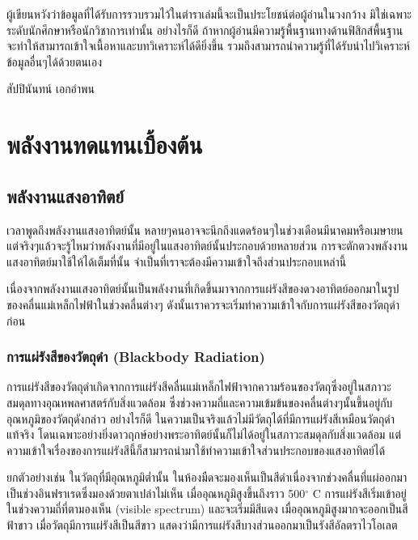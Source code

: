 \message{ !name(solar.tex)}\documentclass[
a4paper,
svgnames,
openany,
justified,
]{tufte-book}
\begin{document}
ผู้เขียนหวังว่าข้อมูลที่ได้รับการรวบรวมไว้ในตำราเล่มนี้จะเป็นประโยชน์ต่อผู้อ่านในวงกว้าง มิใช่เฉพาะระดับนักศึกษาหรือนักวิชาการเท่านั้น อย่างไรก็ดี ถ้าหากผู้อ่านมีความรู้พื้นฐานทางด้านฟิสิกส์พื้นฐาน จะทำให้สามารถเข้าใจเนื้อหาและบทวิเคราะห์ได้ดียิ่งขึ้น รวมถึงสามารถนำความรู้ที่ได้รับนำไปวิเคราะห์ข้อมูลอื่นๆได้ด้วยตนเอง

\vspace{2cm}\hspace{5cm}สัปปินันทน์ เอกอำพน

\clearpage
\tableofcontents

\clearpage
\listoffigures

\clearpage
\listoftables

\mainmatter

\part{พลังงานทดแทนเบื้องต้น}

\chapter{พลังงานแสงอาทิตย์}

เวลาพูดถึงพลังงานแสงอาทิตย์นั้น หลายๆคนอาจจะนึกถึงแดดร้อนๆในช่วงเดือนมีนาคมหรือเมษายน แต่จริงๆแล้วจะรู้ไหมว่าพลังงานที่มีอยู่ในแสงอาทิตย์นั้นประกอบด้วยหลายส่วน การจะตักตวงพลังงานแสงอาทิตย์มาใช้ให้ได้เต็มที่นั้น จำเป็นที่เราจะต้องมีความเข้าใจถึงส่วนประกอบเหล่านี้

เนื่องจากพลังงานแสงอาทิตย์นั้นเป็นพลังงานที่เกิดขึ้นมาจากการแผ่รังสีของดวงอาทิตย์ออกมาในรูปของคลื่นแม่เหล็กไฟฟ้าในช่วงคลื่นต่างๆ ดังนั้นเราควรจะเริ่มทำความเข้าใจกับการแผ่รังสีของวัตถุดำก่อน

\section{การแผ่รังสีของวัตถุดำ (Blackbody Radiation)}

การแผ่รังสีของวัตถุดำเกิดจากการแผ่รังสีคลื่นแม่เหล็กไฟฟ้าจากความร้อนของวัตถุซึ่งอยู่ในสภาวะสมดุลทางอุณหพลศาสตร์กับสิ่งแวดล้อม ซึ่งช่วงความถี่และความเข้มข้นของคลื่นต่างๆนั้นขึ้นอยู่กับอุณหภูมิของวัตถุดังกล่าว อย่างไรก็ดี ในความเป็นจริงแล้วไม่มีวัตถุได้ที่มีการแผ่รังสีเหมือนวัตถุดำแท้จริง โดนเฉพาะอย่างยิ่งดาวฤกษ์อย่างพระอาทิตย์นั้นก็ไม่ได้อยู่ในสภาวะสมดุลกับสิ่งแวดล้อม แต่ความเข้าใจเรื่องของการแผ่รังสีนี้ก็สามารถนำมาใช้ทำความเข้าใจส่วนประกอบของแสงอาทิตย์ได้

ยกตัวอย่างเช่น ในวัตถุที่มีอุณหภูมิต่ำนั้น ในห้องมืดจะมองเห็นเป็นสีดำเนื่องจากช่วงคลื่นที่แผ่ออกมาเป็นช่วงอินฟราเรดซึ่งมองด้วยตาเปล่าไม่เห็น เมื่ออุณหภูมิสูงขึ้นถึงราว 500$^{\circ}$ C การแผ่รังสีเริ่มเข้าอยู่ในช่วงความถี่ที่ตามองเห็น (visible spectrum) และจะเริ่มมีสีแดง เมื่ออุณหภูมิสูงมากจะออกเป็นสีฟ้าขาว เมื่อวัตถุมีการแผ่รังสีเป็นสีขาว แสดงว่ามีการแผ่รังสีบางส่วนออกมาเป็นรังสีอัลตราไวโอเลต
\end{document}
